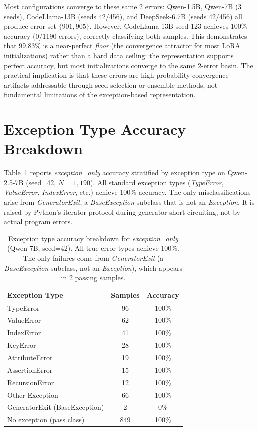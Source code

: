 Most configurations converge to these same 2 errors: Qwen-1.5B, Qwen-7B (3 seeds), CodeLlama-13B (seeds 42/456), and DeepSeek-6.7B (seeds 42/456) all produce error set $\{901, 905\}$.
However, CodeLlama-13B seed 123 achieves 100\% accuracy (0/1190 errors), correctly classifying both samples.
This demonstrates that 99.83\% is a near-perfect \emph{floor} (the convergence attractor for most LoRA initializations) rather than a hard data ceiling: the representation supports perfect accuracy, but most initializations converge to the same 2-error basin.
The practical implication is that these errors are high-probability convergence artifacts addressable through seed selection or ensemble methods, not fundamental limitations of the exception-based representation.

\section{Exception Type Accuracy Breakdown}
\label{sec:exception_type}

Table~\ref{tab:exception_type} reports \textit{exception\_only} accuracy stratified by exception type on Qwen-2.5-7B (seed=42, $N{=}1{,}190$).
All standard exception types (\textit{TypeError}, \textit{ValueError}, \textit{IndexError}, etc.) achieve 100\% accuracy.
The only misclassifications arise from \textit{GeneratorExit}, a \textit{BaseException} subclass that is not an \textit{Exception}. It is raised by Python's iterator protocol during generator short-circuiting, not by actual program errors.

\begin{table}[h!]
\centering
\caption{Exception type accuracy breakdown for \textit{exception\_only} (Qwen-7B, seed=42). All true error types achieve 100\%. The only failures come from \textit{GeneratorExit} (a \textit{BaseException} subclass, not an \textit{Exception}), which appears in 2 passing samples.}
\label{tab:exception_type}
\small
\begin{tabular}{lcc}
\toprule
\textbf{Exception Type} & \textbf{Samples} & \textbf{Accuracy} \\
\midrule
TypeError & 96 & 100\% \\
ValueError & 62 & 100\% \\
IndexError & 41 & 100\% \\
KeyError & 28 & 100\% \\
AttributeError & 19 & 100\% \\
AssertionError & 15 & 100\% \\
RecursionError & 12 & 100\% \\
Other Exception & 66 & 100\% \\
\midrule
GeneratorExit (BaseException) & 2 & 0\% \\
No exception (pass class) & 849 & 100\% \\
\bottomrule
\end{tabular}
\end{table}

